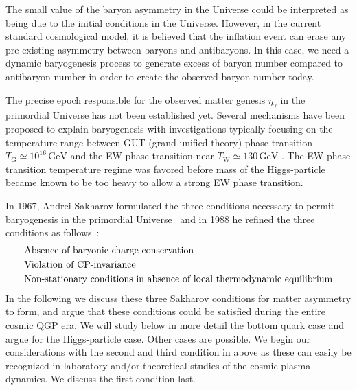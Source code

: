 The small value of the baryon asymmetry in the Universe could be interpreted as being due to the initial conditions in the Universe. However, in the current standard cosmological model, it is believed that the inflation event can erase any pre-existing asymmetry between baryons and antibaryons. In this case, we need a dynamic baryogenesis process to generate excess of baryon number compared to antibaryon number in order to create the observed baryon number today.

The precise epoch responsible for the observed matter genesis $\eta_\gamma$ in the primordial Universe has not been established yet. Several mechanisms have been proposed to explain baryogenesis with investigations typically focusing on the temperature range between GUT (grand unified theory) phase transition $T_\mathrm{G}\simeq10^{16}\,\mathrm{GeV}$ and the EW phase transition near $T_\mathrm{W}\simeq130\,\mathrm{GeV}$ \cite{Kuzmin:1985mm,Kuzmin:1987wn,Arnold:1987mh,Kolb:1996jt,Riotto:1999yt,Nielsen:2001fy,Giudice:2003jh,Davidson:2008bu,Morrissey:2012db,Canetti:2012zc}. {\color{blue}The EW phase transition temperature regime was favored before mass of the Higgs-particle became known to be too heavy to allow a strong EW phase transition.}

In 1967, Andrei Sakharov formulated the three conditions necessary to permit baryogenesis in the primordial Universe~\cite{Sakharov:1967dj} and in 1988 he refined the three conditions as follows~\cite{Sakharov:1988vdp}:
\begin{subequations}\label{Sakharov}
\begin{align}
 &\text{Absence of baryonic charge conservation}\\
 &\text{Violation of CP-invariance}\index{CP
 violation}\\
&\text{Non-stationary conditions in absence of local thermodynamic equilibrium}
\end{align}
\end{subequations}
{\color{blue} In the following we discuss these three Sakharov conditions for matter asymmetry to form, and argue that these conditions  could be satisfied during the entire cosmic QGP era. We will study below in more detail the bottom quark case and argue for the Higgs-particle case. Other cases are possible. We begin our considerations with the second and third condition in  above as these can easily be recognized in laboratory and/or theoretical studies of the cosmic plasma dynamics. We discuss the first condition last.}

